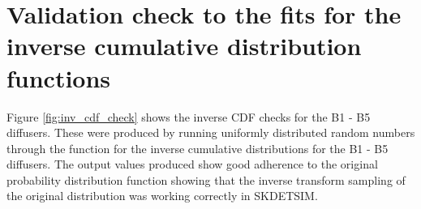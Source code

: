 \begin{figure}
        
    \end{figure}
 

\section{Validation check to the fits for the inverse cumulative distribution functions}

Figure \ref{fig:inv_cdf_check} shows the inverse CDF checks for the B1 - B5 diffusers. These were produced by running uniformly distributed random numbers through the function for the inverse cumulative distributions for the B1 - B5 diffusers. The output values produced show good adherence to the original probability distribution function showing that the inverse transform sampling of the original distribution was working correctly in SKDETSIM. 


